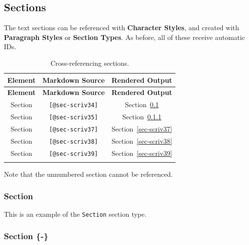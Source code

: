 \documentclass[
  12pt,
  a4paper,
  oneside,
  titlepage,
  toclink=all,
  toc=bibliography]{scrbook}
\theoremstyle{definition}
\theoremstyle{plain}
\theoremstyle{plain}
\theoremstyle{plain}
\theoremstyle{plain}
\theoremstyle{definition}
\theoremstyle{definition}
\theoremstyle{plain}
\theoremstyle{remark}
\begin{document}
\hypertarget{sec-scriv34}{%
\subsection{Sections}\label{sec-scriv34}}

\protect\hypertarget{scriv34}{}{}

The text sections can be referenced with \textbf{Character Styles}, and
created with \textbf{Paragraph Styles} or \textbf{Section Types}. As
before, all of these receive automatic IDs.

\hypertarget{tbl-scriv34}{}
\begin{longtable}[]{@{}ccc@{}}
\toprule\noalign{}
\textbf{Element} & \textbf{Markdown Source} & \textbf{Rendered
Output} \\
\midrule\noalign{}
\endfirsthead
\toprule\noalign{}
\textbf{Element} & \textbf{Markdown Source} & \textbf{Rendered
Output} \\
\midrule\noalign{}
\endhead
\bottomrule\noalign{}
\endlastfoot
Section & \texttt{{[}@sec-scriv34{]}} &
\protect\hypertarget{cite_72}{}{\label{cite_72}Section~\ref{sec-scriv34}} \\
Section & \texttt{{[}@sec-scriv35{]}} &
\protect\hypertarget{cite_73}{}{\label{cite_73}Section~\ref{sec-scriv35}} \\
Section & \texttt{{[}@sec-scriv37{]}} &
\protect\hypertarget{cite_74}{}{\label{cite_74}Section~\ref{sec-scriv37}} \\
Section & \texttt{{[}@sec-scriv38{]}} &
\protect\hypertarget{cite_75}{}{\label{cite_75}Section~\ref{sec-scriv38}} \\
Section & \texttt{{[}@sec-scriv39{]}} &
\protect\hypertarget{cite_76}{}{\label{cite_76}Section~\ref{sec-scriv39}} \\
\caption{\label{tbl-scriv34}Cross-referencing sections.}\tabularnewline
\end{longtable}

Note that the unnumbered section cannot be referenced.

\hypertarget{sec-scriv35}{%
\subsubsection{Section}\label{sec-scriv35}}

\protect\hypertarget{scriv35}{}{}

This is an example of the \texttt{Section} section type.

\hypertarget{sec-scriv36}{%
\subsubsection*{Section \{-\}}\label{sec-scriv36}}
\end{document}
